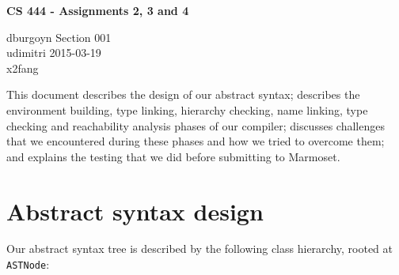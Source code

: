 \documentclass[12pt]{article}
\newcommand{\code}[1]{\texttt{#1}}
\begin{document}
\begin{center}
\textbf{\large{}CS 444 - Assignments 2, 3 and 4}
\end{center}

\begin{flushleft}
dburgoyn \textbf{\hfill{}} Section 001 \\
udimitri \textbf{\hfill{}} 2015-03-19 \\
x2fang \\
\end{flushleft}


This document describes the design of our abstract syntax; describes the environment building, type linking, hierarchy checking, name linking, type checking and reachability analysis phases of our compiler; discusses challenges that we encountered during these phases and how we tried to overcome them; and explains the testing that we did before submitting to Marmoset.

\section{Abstract syntax design}

Our abstract syntax tree is described by the following class hierarchy, rooted at \code{ASTNode}:
\end{document}
